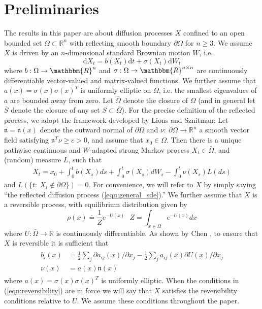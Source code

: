 \documentclass[12pt, nofootinbib,english, amsmath, amssymb, aps, priprint, graphicx,floatfix]{revtex4-1}
\theoremstyle{plain}
\theoremstyle{definition}
\theoremstyle{plain}
\newcommand{\normal}{{\mathfrak{n}}}
\begin{document}
\section{Preliminaries}
\label{sec:Preliminaries}

The results in this paper are about diffusion processes $X$ confined to an open bounded set $\Omega \subset \mathbb{R}^n$ with reflecting smooth boundary $\partial\Omega$ for $n\geq 3$.  We assume $X$ is driven by an $n$-dimensional standard Brownian motion $W$, i.e.
\begin{equation}\label{equ:general_sde}\mathrm{d} X_t = b (X_t) \mathrm{d} t + \sigma (X_t) \mathrm{d} W_t \end{equation}
where $b: \Omega \rightarrow \mathbbm{R}^n$ and $\sigma :
\Omega \rightarrow \mathbbm{R}^{n \times n}$ are continuously differentiable vector-valued and matrix-valued functions.  We further assume that $a(x)=\sigma(x)\sigma(x)^T$ is uniformly elliptic on $\Omega$, i.e. the smallest eigenvalues of $a$ are bounded away from zero.  Let $\bar \Omega$ denote the closure of $\Omega$ (and in general let $\bar S$ denote the closure of any set $S\subset \bar \Omega$).  For the precise definition of the reflected process, we adopt the framework developed by Lions and Sznitman\cite{lions1984stochastic}: Let $\normal=\normal(x)$ denote the outward normal of $\partial \Omega$ and $\nu:\ \partial \Omega \rightarrow \mathbb{R}^n$ a smooth vector field satisfying $\normal^T\nu\geq c>0$, and assume that $x_0 \in \Omega$.  Then there is a unique pathwise continuous
and $W$-adapted strong Markov process $X_t\in\bar\Omega$, and (random) measure $L$, such that
\begin{gather}\label{eq:SDER}
X_t = x_0 + \int_0^t b(X_s)ds + \int_0^t \sigma(X_s)dW_s - \int_0^t \nu(X_s) L(ds)
\end{gather}
and $L(\{t:\ X_t \notin \partial \Omega\})=0$.
For convenience, we will refer to $X$ by simply saying ``the reflected diffusion process (\ref{equ:general_sde}).'' We further assume that $X$ is a reversible process, with equilibrium distribution given by
\[
\rho(x)\doteq \frac{1}{Z}e^{-U(x)}\ \ \
Z=\int_{x\in\Omega}e^{-U(x)}dx
\]
where $U:\bar \Omega \rightarrow \mathbb{R}$ is continuously differentiable.  As shown by Chen \cite{chen1993reflecting}, to ensure that $X$ is reversible it is sufficient that
\begin{align}
\begin{split}
b_i(x)&=\frac{1}{2} \sum_j \partial a_{ij}(x)/\partial x_j - \frac{1}{2}\sum_j a_{ij}(x) \partial U(x)/\partial x_j
\label{eqn:reversibility} \\
\nu(x)&= a(x) \normal(x)
\end{split}
\end{align}
where $a(x)=\sigma(x)\sigma(x)^T$ is uniformly elliptic.
When the conditions in (\ref{eqn:reversibility}) are in force
we will say that $X$ satisfies the reversibility conditions relative to $U$.  We assume these conditions throughout the paper.
\end{document}
